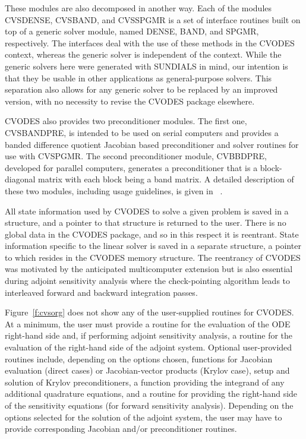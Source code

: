 These modules are also decomposed in another way.
Each of the modules CVSDENSE, CVSBAND, and CVSSPGMR is a set of 
interface routines built on top of a generic solver module, 
named DENSE, BAND, and SPGMR, respectively.  
The interfaces deal with the use of these methods in the CVODES context, 
whereas the generic solver is independent of the context.
While the generic solvers here were generated with SUNDIALS in mind, our
intention is that they be usable in other applications as
general-purpose solvers.  This separation also allows for any generic
solver to be replaced by an improved version, with no necessity to
revise the CVODES package elsewhere.

CVODES also provides two preconditioner modules. The first one, 
CVSBANDPRE, is intended to be used on serial computers and provides
a banded difference quotient Jacobian based preconditioner and solver
routines for use with CVSPGMR. The second preconditioner module, 
CVBBDPRE, developed for parallel computers, generates a 
preconditioner that is a block-diagonal matrix with each block being 
a band matrix. A detailed description of these two modules, including
usage guidelines, is given in ~\cite{HBGLSSW:04}.

All state information used by CVODES to solve a given problem is saved
in a structure, and a pointer to that structure is returned to the
user.  There is no global data in the CVODES package, and so in this
respect it is reentrant. State information specific to the linear
solver is saved in a separate structure, a pointer to which resides in
the CVODES memory structure. The reentrancy of CVODES was motivated
by the anticipated multicomputer extension but is also essential
during adjoint sensitivity analysis where the check-pointing algorithm
leads to interleaved forward and backward integration passes. 

Figure~\ref{f:cvsorg} does not show any of the user-supplied routines 
for CVODES. At a minimum, the user must provide a routine for the evaluation 
of the ODE right-hand side and, if performing adjoint sensitivity analysis,
a routine for the evaluation of the right-hand side of the adjoint system. 
Optional user-provided routines include, depending on the options chosen, 
functions for Jacobian evaluation (direct cases) or Jacobian-vector products 
(Krylov case), setup and solution of Krylov preconditioners, a function providing 
the integrand of any additional quadrature equations, and a routine for
providing the right-hand side of the sensitivity equations (for forward sensitivity
analysis). Depending on the options selected for the solution of the adjoint
system, the user may have to provide corresponding Jacobian and/or preconditioner
routines.

